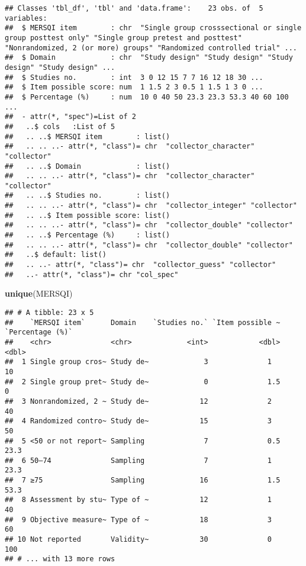 \documentclass[]{article}
\newenvironment{Shaded}{\begin{snugshade}}{\end{snugshade}}
\newcommand{\KeywordTok}[1]{\textcolor[rgb]{0.13,0.29,0.53}{\textbf{#1}}}
\newcommand{\NormalTok}[1]{#1}
\begin{document}
\begin{verbatim}
## Classes 'tbl_df', 'tbl' and 'data.frame':    23 obs. of  5 variables:
##  $ MERSQI item        : chr  "Single group crosssectional or single group posttest only" "Single group pretest and posttest" "Nonrandomized, 2 (or more) groups" "Randomized controlled trial" ...
##  $ Domain             : chr  "Study design" "Study design" "Study design" "Study design" ...
##  $ Studies no.        : int  3 0 12 15 7 7 16 12 18 30 ...
##  $ Item possible score: num  1 1.5 2 3 0.5 1 1.5 1 3 0 ...
##  $ Percentage (%)     : num  10 0 40 50 23.3 23.3 53.3 40 60 100 ...
##  - attr(*, "spec")=List of 2
##   ..$ cols   :List of 5
##   .. ..$ MERSQI item        : list()
##   .. .. ..- attr(*, "class")= chr  "collector_character" "collector"
##   .. ..$ Domain             : list()
##   .. .. ..- attr(*, "class")= chr  "collector_character" "collector"
##   .. ..$ Studies no.        : list()
##   .. .. ..- attr(*, "class")= chr  "collector_integer" "collector"
##   .. ..$ Item possible score: list()
##   .. .. ..- attr(*, "class")= chr  "collector_double" "collector"
##   .. ..$ Percentage (%)     : list()
##   .. .. ..- attr(*, "class")= chr  "collector_double" "collector"
##   ..$ default: list()
##   .. ..- attr(*, "class")= chr  "collector_guess" "collector"
##   ..- attr(*, "class")= chr "col_spec"
\end{verbatim}

\begin{Shaded}
\begin{Highlighting}[]
\KeywordTok{unique}\NormalTok{(MERSQI)}
\end{Highlighting}
\end{Shaded}

\begin{verbatim}
## # A tibble: 23 x 5
##    `MERSQI item`      Domain    `Studies no.` `Item possible ~ `Percentage (%)`
##    <chr>              <chr>             <int>            <dbl>            <dbl>
##  1 Single group cros~ Study de~             3              1               10  
##  2 Single group pret~ Study de~             0              1.5              0  
##  3 Nonrandomized, 2 ~ Study de~            12              2               40  
##  4 Randomized contro~ Study de~            15              3               50  
##  5 <50 or not report~ Sampling              7              0.5             23.3
##  6 50–74              Sampling              7              1               23.3
##  7 ≥75                Sampling             16              1.5             53.3
##  8 Assessment by stu~ Type of ~            12              1               40  
##  9 Objective measure~ Type of ~            18              3               60  
## 10 Not reported       Validity~            30              0              100  
## # ... with 13 more rows
\end{verbatim}
\end{document}
